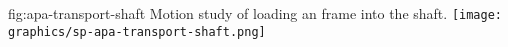 \begin{dunefigure}{fig:apa-transport-shaft}
{Motion study of loading an  frame into the shaft.}  
\texttt{[image: graphics/sp-apa-transport-shaft.png]} 
\end{dunefigure}

\begin{comment}
Figure~\ref{fig:apa-transport-frame} shows the current concept for a transport frame, which comprises of a central support and a left- and right-hand bolted-on cage.  The \dword{apa}s are connected to the central support by means of two sets of vertical spring struts. These are sprung to allow for anti-vibration and reduce any shock loads to the \dword{apa}s when being transported.  

Work is ongoing to finalize the transport crate design and plan the details of the transport procedures.

The spring system is shown in Figure~\ref{fig:apa-transport-springs}. It comprises two vertical struts with three springs per pair. The ``wire rope \fixme{isolator?}'' springs are %
manufactured by Vibrostop~\footnote{
Vibrostop\textregistered{} Cavoflex, \url{https://www.vibrostop.it/en/product/wire-rope-isolators/cavoflex/}
}. 
Vibrostop will perform the relevant calculations based on input data, such as methods of travel (by road or by sea) and lifting operations when loading onto a trailer or being manipulated down the shaft at \dword{surf}.

\begin{dunefigure}[APA transport frame spring system]{fig:apa-transport-springs}
{Transport frame designed to transport two \dword{apa}s between production sites and the \dword{sdwf} then to the Ross Headframe at  \dword{surf}.}  \fixme{anne changed caption - no more ITF}
\texttt{[image: sp-apa-transport-spring.png]} \qquad
\texttt{[image: sp-apa-transport-detail.png]} 
\end{dunefigure}
\end{comment}


